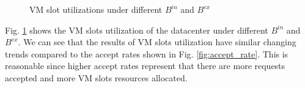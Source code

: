 \documentclass[review]{elsarticle}
\begin{document}
\begin{figure}[H]
	\centering
	
	\caption{VM slot utilizations under different $B^{in}$ and $B^{ex}$}
	\label{fig:vm_util}
\end{figure}
Fig. \ref{fig:vm_util} shows the VM slots utilization of the datacenter under different $B^{in}$ and $B^{ex}$. We can see that the results of VM slots utilization have similar changing trends compared to the accept rates shown in Fig. \ref{fig:accept_rate}.
This is reasonable since higher accept rates represent that there are more requests accepted and more VM slots resources allocated.  
\end{document}
